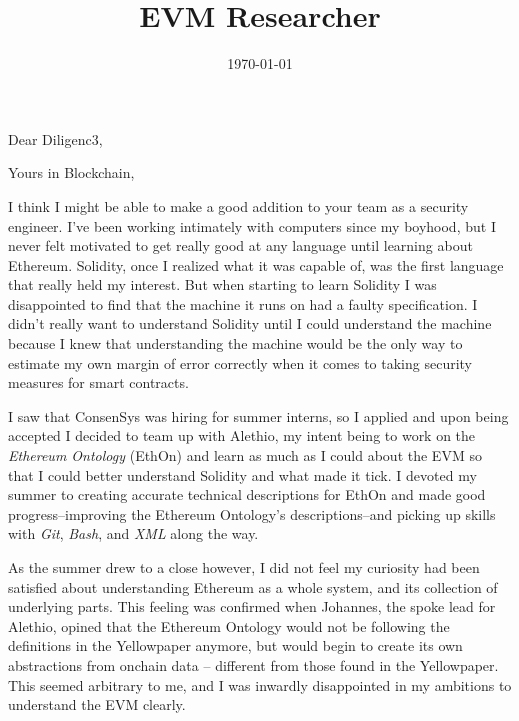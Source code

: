 \documentclass[11pt,a4paper,sans]{moderncv}
\title{EVM Researcher}                               %
\begin{document}
\date{\today}
\opening{Dear Diligenc3,}
\closing{Yours in Blockchain,}
\makelettertitle

I think I might be able to make a good addition to your team as a security engineer. I've been working intimately with computers since my boyhood, but I never felt motivated to get really good at any language until learning about Ethereum. Solidity, once I realized what it was capable of, was the first language that really held my interest. But when starting to learn Solidity I was disappointed to find that the machine it runs on had a faulty specification. I didn't really want to understand Solidity until I could understand the machine because I knew that understanding the machine would be the only way to estimate my own margin of error correctly when it comes to taking security measures for smart contracts. 

I saw that ConsenSys was hiring for summer interns, so I applied and upon being accepted I decided to team up with Alethio, my intent being to work on the \textit{Ethereum Ontology} (EthOn) and learn as much as I could about the EVM so that I could better understand Solidity and what made it tick. I devoted my summer to creating accurate technical descriptions for EthOn and made good progress--improving the Ethereum Ontology's descriptions--and picking up skills with \textit{Git}, \textit{Bash}, and \textit{XML} along the way. 

As the summer drew to a close however, I did not feel my curiosity had been satisfied about understanding Ethereum as a whole system, and its collection of underlying parts. This feeling was confirmed when Johannes, the spoke lead for Alethio, opined that the Ethereum Ontology would not be following the definitions in the Yellowpaper anymore, but would begin to create its own abstractions from onchain data -- different from those found in the Yellowpaper. This seemed arbitrary to me, and I was inwardly disappointed in my ambitions to understand the EVM clearly. 
\end{document}
